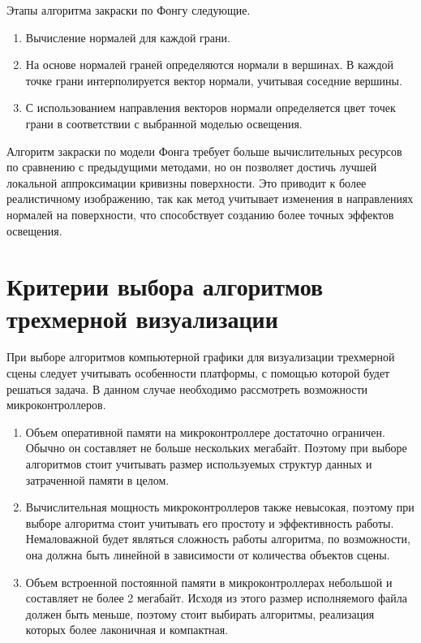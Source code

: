 Этапы алгоритма закраски по Фонгу следующие.
\begin{enumerate}
    \item Вычисление нормалей для каждой грани.
    \item На основе нормалей граней определяются нормали в вершинах. 
    В каждой точке грани интерполируется вектор нормали, учитывая соседние вершины.
    \item С использованием направления векторов нормали определяется цвет точек грани в соответствии с выбранной моделью освещения.
\end{enumerate}

Алгоритм закраски по модели Фонга требует больше вычислительных ресурсов по сравнению с предыдущими методами, но он позволяет достичь лучшей локальной аппроксимации кривизны поверхности. 
Это приводит к более реалистичному изображению, так как метод учитывает изменения в направлениях нормалей на поверхности, что способствует созданию более точных эффектов освещения.

\section{Критерии выбора алгоритмов трехмерной визуализации}
При выборе алгоритмов компьютерной графики для визуализации трехмерной сцены следует учитывать особенности платформы, с помощью которой будет решаться задача. 
В данном случае необходимо рассмотреть возможности микроконтроллеров.

\begin{enumerate}
    \item Объем оперативной памяти на микроконтроллере достаточно ограничен. 
    Обычно он составляет не больше нескольких мегабайт. 
    Поэтому при выборе алгоритмов стоит учитывать размер используемых структур данных и затраченной памяти в целом.
    \item Вычислительная мощность микроконтроллеров также невысокая, поэтому при выборе алгоритма стоит учитывать его простоту и эффективность работы. 
    Немаловажной будет являться сложность работы алгоритма, по возможности, она должна быть линейной в зависимости от количества объектов сцены. 
    \item Объем встроенной постоянной памяти в микроконтроллерах небольшой и составляет не более 2 мегабайт. 
    Исходя из этого размер исполняемого файла должен быть меньше, поэтому стоит выбирать алгоритмы, реализация которых более лаконичная и компактная.
\end{enumerate}

